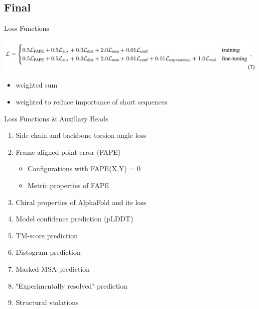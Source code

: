 \documentclass[presentation, smaller]{beamer}
\begin{document}
\subsection*{Final}
\label{sec:orge63b1f1}
\begin{frame}[label={sec:org68597aa}]{Loss Functions  \cite{jumperHighlyAccurateProtein2021}}
\begin{center}
\includegraphics[width=.9\linewidth]{./imgs/loss-eq.png}
\end{center}

\begin{itemize}
\item weighted sum
\item weighted to reduce importance of short sequences
\end{itemize}
\end{frame}

\begin{frame}[label={sec:org7acd076}]{Loss Functions \& Auxillary Heads \cite{jumperHighlyAccurateProtein2021}}
\begin{enumerate}
\item Side chain and backbone torsion angle loss
\item Frame aligned point error (FAPE)
\begin{itemize}
\item Configurations with FAPE(X,Y) = 0
\item Metric properties of FAPE
\end{itemize}
\item Chiral properties of AlphaFold and its loss
\item Model confidence prediction (pLDDT)
\item TM-score prediction
\item Distogram prediction
\item Masked MSA prediction
\item "Experimentally resolved" prediction
\item Structural violations
\end{enumerate}
\end{frame}
\end{document}
